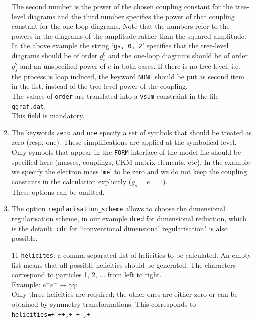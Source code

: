 \documentclass[11pt,a4paper]{refrep}
\newcommand{\form}{{\tt FORM}\xspace}
\begin{document}
\begin{enumerate}
The second number is the power of the chosen coupling constant for the
tree-level diagrams and the third number specifies the power of that
coupling constant for the one-loop diagrams.
Note that the numbers
refer to the powers in the diagrams of the amplitude
rather than the squared amplitude. In the above example the
string `\lstinline[basicstyle=\ttfamily]{gs, 0, 2}' specifies that
the tree-level diagrams should be of order $g_s^0$ and the one-loop
diagrams should be of order $g_s^2$ and an unspecified
power of $e$ in both cases. 
If there is no tree level, i.e. the process is loop induced, 
the keyword \texttt{NONE} should be put as second item in the list,
instead of the tree level power of the coupling.\\
The values of {\tt order} are
translated into a \texttt{vsum} constraint in the file \texttt{qgraf.dat}.
\\This field is mandatory.
\item[8--9] The keywords \texttt{zero} and \texttt{one} specify
a set of symbols that should be treated as zero (resp. one). These
simplifications are applied at the symbolical level. Only symbols
that appear in the \form{} interface of the model file should be
specified here (masses, couplings, CKM-matrix elements, etc).
In the example we specify the electron mass
`\lstinline[basicstyle=\ttfamily]{me}' to be zero and we do not keep
the coupling constants in the calculation explicitly ($g_s=e=1$).
\\These options can be omitted.
\item[10] The option \texttt{regularisation\_scheme} 
allows to choose the dimensional regularisation scheme, in our example {\tt dred} for 
dimensional reduction, which is the default.
{\tt cdr} for ``conventional dimensional regularisation" is also possible.
\item[11] \texttt{helicites}:  a comma separated list of helicities to be calculated. 
An empty list means that all possible helicities should be generated.         
The characters correspond to particles 1, 2, ... from left to right.   \\
 Example:                                                       
 $e^+ e^- \to \gamma \gamma$:    \\                               
 Only three helicities are required; the other ones are         
  either zero or can be obtained by symmetry                 
  transformations. This corresponds to\\                                       
      {\tt  helicities=+-++,+-+-,+---}  \\

\end{enumerate}
\end{document}
